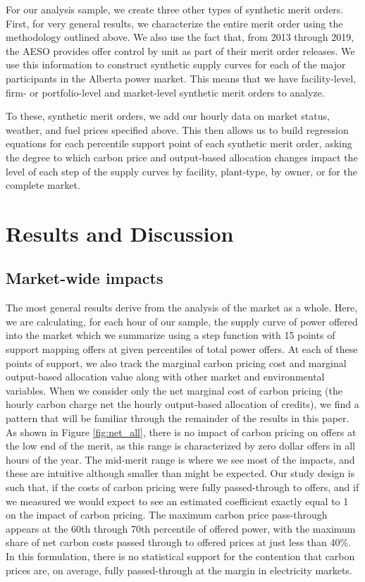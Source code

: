 \documentclass[12pt]{article}
\begin{document}
For our analysis sample, we create three other types of synthetic merit orders. First, for very general results, we characterize the entire merit order using the methodology outlined above. We also use the fact that, from 2013 through 2019, the AESO provides offer control by unit as part of their merit order releases. We use this information to construct synthetic supply curves for each of the major participants in the Alberta power market. This means that we have facility-level, firm- or portfolio-level and market-level synthetic merit orders to analyze.

To these, synthetic merit orders, we add our hourly data on market status, weather, and fuel prices specified above. This then allows us to build regression equations for each percentile support point of each synthetic merit order, asking the degree to which carbon price and output-based allocation changes impact the level of each step of the supply curves by facility, plant-type, by owner, or for the complete market.

\section{Results and Discussion}


\subsection{Market-wide impacts}
The most general results derive from the analysis of the market as a whole. Here, we are calculating, for each hour of our sample, the supply curve of power offered into the market which we summarize using a step function with 15 points of support mapping offers at given percentiles of total power offers. At each of these points of support, we also track the marginal carbon pricing cost and marginal output-based allocation value along with other market and environmental variables. When we consider only the net marginal cost of carbon pricing (the hourly carbon charge net the hourly output-based allocation of credits), we find a pattern that will be familiar through the remainder of the results in this paper. As shown in Figure \ref{fig:net_all}, there is no impact of carbon pricing on offers at the low end of the merit, as this range is characterized by zero dollar offers in all hours of the year. The mid-merit range is where we see most of the impacts, and these are intuitive although smaller than might be expected. Our study design is such that, if the costs of carbon pricing were fully passed-through to offers, and if we measured we would expect to see an estimated coefficient exactly equal to 1 on the impact of carbon pricing. The maximum carbon price pass-through appears at the 60th through 70th percentile of offered power, with the maximum share of net carbon costs passed through to offered prices at just less than 40\%. In this formulation, there is no statistical support for the contention that carbon prices are, on average, fully passed-through at the margin in electricity markets.
\end{document}

